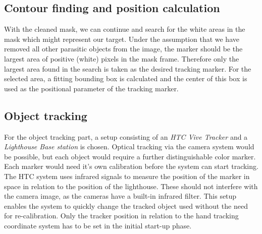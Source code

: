 \subsection{Contour finding and position calculation}
With the cleaned mask, we can continue and search for the white areas in the mask which might represent our target. Under the assumption that we have removed all other parasitic objects from the image, the marker should be the largest area of positive (white)  pixels in the mask frame. Therefore only the largest area found in the search is taken as the desired tracking marker. For the selected area, a fitting bounding box is calculated and the center of this box is used as the positional parameter of the tracking marker.
\subsection{Object tracking}
For the object tracking part, a setup consisting of an \textit{HTC Vive Tracker} and a \textit{Lighthouse Base station} is chosen. Optical tracking via the camera system would be possible, but each object would require a further distinguishable color marker. Each marker would need it's own calibration before the system can start tracking. The HTC system uses infrared signals to measure the position of the marker in space in relation to the position of the lighthouse. These should not interfere with the camera image, as the cameras have a built-in infrared filter. This setup enables the system to quickly change the tracked object used without the need for re-calibration. Only the tracker position in relation to the hand tracking coordinate system has to be set in the initial start-up phase.  

